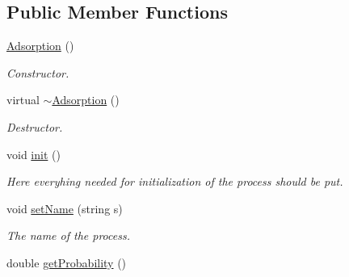 \subsection*{Public Member Functions}
\begin{DoxyCompactItemize}
\item 
\mbox{\label{classMicroProcesses_1_1Adsorption_a97591e8501cd748e11fcb863f030151f}} 
\mbox{\hyperlink{classMicroProcesses_1_1Adsorption_a97591e8501cd748e11fcb863f030151f}{Adsorption}} ()
\begin{DoxyCompactList}\small\item\em Constructor. \end{DoxyCompactList}\item 
\mbox{\label{classMicroProcesses_1_1Adsorption_a711c074d39b4fe218bb9229fb42bb4e3}} 
virtual \mbox{\hyperlink{classMicroProcesses_1_1Adsorption_a711c074d39b4fe218bb9229fb42bb4e3}{$\sim$\+Adsorption}} ()
\begin{DoxyCompactList}\small\item\em Destructor. \end{DoxyCompactList}\item 
\mbox{\label{classMicroProcesses_1_1Adsorption_ac0488825b7514a0866f52996730ad407}} 
void \mbox{\hyperlink{classMicroProcesses_1_1Adsorption_ac0488825b7514a0866f52996730ad407}{init}} ()
\begin{DoxyCompactList}\small\item\em Here everyhing needed for initialization of the process should be put. \end{DoxyCompactList}\item 
\mbox{\label{classMicroProcesses_1_1Adsorption_ab0382497dbd736345c80a301c069455d}} 
void \mbox{\hyperlink{classMicroProcesses_1_1Adsorption_ab0382497dbd736345c80a301c069455d}{set\+Name}} (string s)
\begin{DoxyCompactList}\small\item\em The name of the process. \end{DoxyCompactList}\item 
\mbox{\label{classMicroProcesses_1_1Adsorption_a7bc570bc528b5a8903556dc7f9b2c681}} 
double \mbox{\hyperlink{classMicroProcesses_1_1Adsorption_a7bc570bc528b5a8903556dc7f9b2c681}{get\+Probability}} ()

\end{DoxyCompactItemize}
